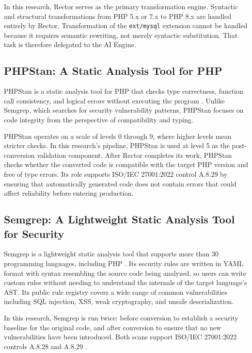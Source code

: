 In this research, Rector serves as the primary transformation engine. Syntactic and structural transformations from PHP 5.x or 7.x to PHP 8.x are handled entirely by Rector. Transformation of the \texttt{ext/mysql} extension cannot be handled because it requires semantic rewriting, not merely syntactic substitution. That task is therefore delegated to the AI Engine.

\subsection{PHPStan: A Static Analysis Tool for PHP}

PHPStan is a static analysis tool for PHP that checks type correctness, function call consistency, and logical errors without executing the program \cite{phpstan2024}. Unlike Semgrep, which searches for security vulnerability patterns, PHPStan focuses on code integrity from the perspective of compatibility and typing.

PHPStan operates on a scale of levels 0 through 9, where higher levels mean stricter checks. In this research's pipeline, PHPStan is used at level 5 as the post-conversion validation component. After Rector completes its work, PHPStan checks whether the converted code is compatible with the target PHP version and free of type errors. Its role supports ISO/IEC 27001:2022 control A.8.29 \cite{iso27001_2022} by ensuring that automatically generated code does not contain errors that could affect reliability before entering production.

\subsection{Semgrep: A Lightweight Static Analysis Tool for Security}

Semgrep is a lightweight static analysis tool that supports more than 30 programming languages, including PHP \cite{semgrep2024}. Its security rules are written in YAML format with syntax resembling the source code being analyzed, so users can write custom rules without needing to understand the internals of the target language's AST. Its public rule registry covers a wide range of common vulnerabilities including SQL injection, XSS, weak cryptography, and unsafe deserialization.

In this research, Semgrep is run twice: before conversion to establish a security baseline for the original code, and after conversion to ensure that no new vulnerabilities have been introduced. Both scans support ISO/IEC 27001:2022 controls A.8.28 and A.8.29 \cite{iso27001_2022}.

